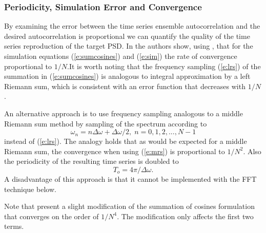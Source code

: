 \documentclass[techreport, article]{npsreport2018}
\begin{document}
\subsubsection{Periodicity, Simulation Error and Convergence}

By examining the error between the time series ensemble autocorrelation and the
desired autocorrelation is proportional we can quantify the quality of the time series reproduction of the target PSD. In \cite{shinozuka91simulation} the authors show, using \cite{conte17elementary},  that for the simulation equations (\ref{e:sumcosines}) and (\ref{e:sim}) the rate of convergence proportional to $1/N$.It is worth noting that the frequency sampling (\ref{e:lrs}) of the summation in (\ref{e:sumcosines}) is analogous to integral approximation by a left Riemann sum, which is consistent with an error function that decreases with $1/N$.

An alternative approach is to use frequency sampling analogous to a middle Riemann sum method by sampling of the spectrum according to 
\begin{equation}
  \omega_n = n \Delta \omega + \Delta \omega /2 , \; n=0,1,2,...,N-1
  \label{e:mrs}
\end{equation}
instead of (\ref{e:lrs}).
The analogy holds that as would be expected for a middle Riemann sum, the convergence when using (\ref{e:mrs}) is proportional to $1/N^2$.  Also the periodicity of the resulting time series is doubled to
\begin{equation}
  T_o = 4\pi / \Delta \omega.
  \label{e:to}
\end{equation}
A disadvantage of this approach is that it cannot be implemented with the FFT technique below.

Note that \cite{hu97simulation} present a slight modification of the summation of cosines formulation that converges on the order of $1/N^4$.  The modification only affects the first two terms.
\end{document}

